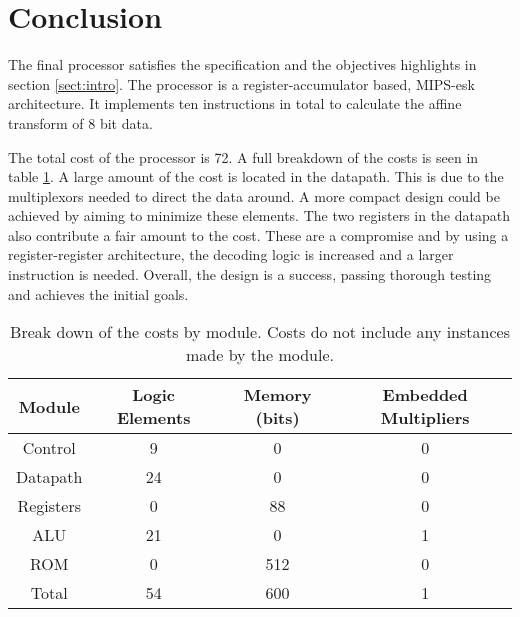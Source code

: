 

\section{Conclusion}

The final processor satisfies the specification and the objectives highlights in section \ref{sect:intro}.
The processor is a register-accumulator based, MIPS-esk architecture. 
It implements ten instructions in total to calculate the affine transform of 8 bit data.

The total cost of the processor is 72.
A full breakdown of the costs is seen in table \ref{tab:costs}.
A large amount of the cost is located in the datapath. 
This is due to the multiplexors needed to direct the data around. 
A more compact design could be achieved by aiming to minimize these elements. 
The two registers in the datapath also contribute a fair amount to the cost. 
These are a compromise and by using a register-register architecture, the decoding logic is increased and a larger instruction is needed.
Overall, the design is a success, passing thorough testing and achieves the initial goals. 


\begin{table}
\caption{Break down of the costs by module. Costs do not include any instances made by the module.}
\label{tab:costs}
\begin{tabular}{cccc} \hline
Module		& Logic Elements	& Memory (bits)	& Embedded Multipliers \\ \hline
Control		& 9			& 0		& 0	\\
Datapath	& 24			& 0		& 0	\\
Registers	& 0			& 88		& 0	\\
ALU		& 21			& 0		& 1	\\
ROM		& 0			& 512		& 0 	\\ \hline
Total 		& 54			& 600		& 1 	\\ \hline
\end{tabular}
\end{table}



